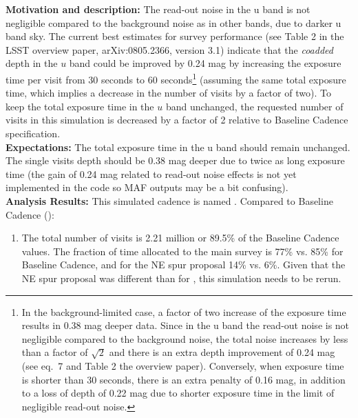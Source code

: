 

{\bf Motivation and description:} The read-out noise in the u band is
not negligible compared to the background noise as in other bands, due
to darker u band sky. The current best estimates for survey
performance (see Table 2 in the LSST overview paper, arXiv:0805.2366,
version 3.1) indicate that the {\it coadded} depth in the $u$ band
could be improved by 0.24 mag by increasing the exposure time per
visit from 30 seconds to 60 seconds\footnote{In the background-limited
case, a factor of two increase of the exposure time results in 0.38
mag deeper data. Since in the u band the read-out noise is not
negligible compared to the background noise, the total noise increases
by less than a factor of $\sqrt{2}$ and there is an extra depth
improvement of 0.24 mag (see eq.~7 and Table 2 the overview paper).
Conversely, when exposure time is shorter than 30 seconds, there is an
extra penalty of 0.16 mag, in addition to a loss of depth of 0.22 mag
due to shorter exposure time in the limit of negligible read-out
noise.} (assuming the same total exposure time, which implies a
decrease in the number of visits by a factor of two). To keep the
total exposure time in the $u$ band unchanged, the requested number of
visits in this simulation is decreased by a factor of 2 relative to
Baseline Cadence specification. \\

{\bf Expectations:} The total exposure time in the u band should
remain unchanged. The single visits depth should be 0.38 mag deeper
due to twice as long exposure time (the gain of 0.24 mag related to
read-out noise effects is not yet implemented in the \OpSim code so MAF
outputs may be a bit confusing). \\

{\bf Analysis Results:} This simulated cadence is named .  Compared
to Baseline Cadence ():
\begin{enumerate}
\item The total number of visits is 2.21 million or 89.5\% of the
Baseline Cadence values. The fraction of time allocated to the main
survey is 77\% vs. 85\% for Baseline Cadence, and for the NE spur
proposal 14\% vs. 6\%. Given that the NE spur proposal was different
than for , this simulation needs to be rerun.
\end{enumerate}

